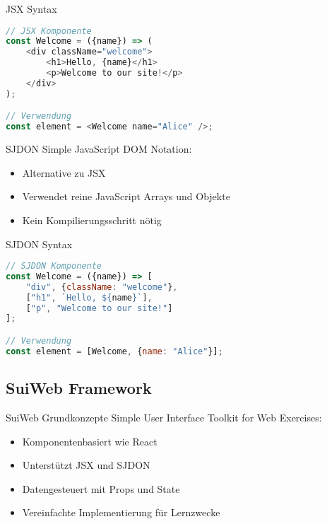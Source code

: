 \begin{KR}{JSX Syntax}
\begin{lstlisting}[language=JavaScript, style=basesmol]
// JSX Komponente
const Welcome = ({name}) => (
    <div className="welcome">
        <h1>Hello, {name}</h1>
        <p>Welcome to our site!</p>
    </div>
);

// Verwendung
const element = <Welcome name="Alice" />;
\end{lstlisting}
\end{KR}

\begin{definition}{SJDON}
    Simple JavaScript DOM Notation:
    \begin{itemize}
        \item Alternative zu JSX
        \item Verwendet reine JavaScript Arrays und Objekte
        \item Kein Kompilierungsschritt nötig
    \end{itemize}
\end{definition}

\begin{KR}{SJDON Syntax}
\begin{lstlisting}[language=JavaScript, style=basesmol]
// SJDON Komponente
const Welcome = ({name}) => [
    "div", {className: "welcome"},
    ["h1", `Hello, ${name}`],
    ["p", "Welcome to our site!"]
];

// Verwendung
const element = [Welcome, {name: "Alice"}];
\end{lstlisting}
\end{KR}

\subsection{SuiWeb Framework}

\begin{concept}{SuiWeb Grundkonzepte}
    Simple User Interface Toolkit for Web Exercises:
    \begin{itemize}
        \item Komponentenbasiert wie React
        \item Unterstützt JSX und SJDON
        \item Datengesteuert mit Props und State
        \item Vereinfachte Implementierung für Lernzwecke
    \end{itemize}
\end{concept}

